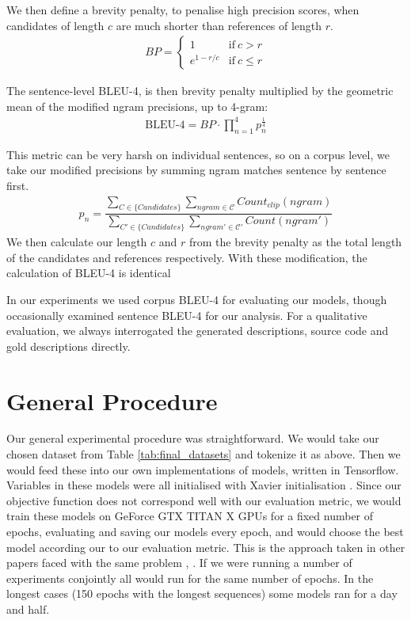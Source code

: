 We then define a brevity penalty, to penalise high precision scores, when candidates of length $c$ are much shorter than references of length $r$.
\begin{align}
BP = \begin{cases}
      1 & \text{if}\ c > r \\
      e^{1-r/c} & \text{if}\ c \leq r
    \end{cases}\nonumber
\end{align}

The sentence-level BLEU-4, is then brevity penalty multiplied by the geometric mean of the modified ngram precisions, up to 4-gram:
\begin{align}
\text{BLEU-4} = BP\cdotp\prod_{n=1}^4 p_n^{\frac{1}{4}}
\end{align}

This metric can be very harsh on individual sentences, so on a corpus level, we take our modified precisions by summing ngram matches sentence by sentence first.
\begin{align}
    p_n = \dfrac{
    \sum_{C \in \{Candidates\}}\sum_{ngram \in \mathcal{C}} Count_{clip}(ngram)}{
    \sum_{C' \in \{Candidates\}}\sum_{ngram' \in \mathcal{C'}} Count(ngram')} \nonumber 
\end{align}
We then calculate our length $c$ and $r$ from the brevity penalty as the total length of the candidates and references respectively.
With these modification, the calculation of BLEU-4 is identical

In our experiments we used corpus BLEU-4 for evaluating our models, though occasionally examined sentence BLEU-4 for our analysis. 
For a qualitative evaluation, we always interrogated the generated descriptions, source code and gold descriptions directly.


\section{General Procedure}
\label{sec:general_procedure}

Our general experimental procedure was straightforward. We would take our chosen dataset from Table \ref{tab:final_datasets} and  tokenize it as above. Then we would feed these into our own implementations of models, written in Tensorflow\cite{tensorflow2015-whitepaper}. Variables in these models were all initialised with Xavier initialisation \cite{glorot_understanding_nodate}. Since our objective function does not correspond well with our evaluation metric, we would train these models on GeForce GTX TITAN X GPUs for a fixed number of epochs, evaluating and saving our models every epoch, and would choose the best model according our to our evaluation metric. This is the approach taken in other papers faced with the same problem \cite{bahdanau_neural_2014}, \cite{barone_parallel_2017}.  If we were running a number of experiments conjointly all would run for the same number of epochs. In the longest cases (150 epochs with the longest sequences) some models ran for a day and half.

